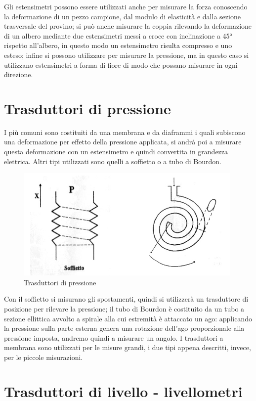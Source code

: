 
Gli estensimetri possono essere utilizzati anche per misurare la forza
conoscendo la deformazione di un pezzo campione, dal modulo di
elasticità e dalla sezione trasversale del provino; si può anche
misurare la coppia rilevando la deformazione di un albero mediante due
estensimetri messi a croce con inclinazione a 45° rispetto all'albero,
in questo modo un estensimetro risulta compresso e uno esteso; infine
si possono utilizzare per misurare la pressione, ma in questo caso si
utilizzano estensimetri a forma di fiore di modo che possano misurare
in ogni direzione.

\section{Trasduttori di pressione}
I più comuni sono costituiti da una membrana e da diaframmi i quali
subiscono una deformazione per effetto della pressione applicata, si
andrà poi a misurare questa deformazione con un estensimetro e quindi
convertita in grandezza elettrica. Altri tipi utilizzati sono quelli a
soffietto o a tubo di Bourdon.

\begin{figure}[htbp]
	\centering
	\includegraphics[scale=0.5]
			{img/pressione.png}
	\caption{Trasduttori di pressione
\label{fig:pressione}}
\end{figure}

Con il soffietto si misurano gli spostamenti, quindi si utilizzerà un
trasduttore di posizione per rilevare la pressione; il tubo di Bourdon
è costituito da un tubo a sezione ellittica avvolto a spirale alla cui
estremità è attaccato un ago: applicando la pressione sulla parte
esterna genera una rotazione dell'ago proporzionale alla pressione
imposta, andremo quindi a misurare un angolo.
I trasduttori a membrana sono utilizzati per le misure grandi, i due
tipi appena descritti, invece, per le piccole misurazioni.
\section{Trasduttori di livello - livellometri}